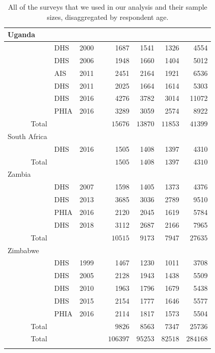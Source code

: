 \documentclass[a4paper, nobind]{templates/ociamthesis}
\newcommand{\cmark}{\ding{51}}
\newcommand{\xmark}{\ding{55}}
\begin{document}
\begin{longtable}{rlrcrrrr}
\midrule
\multicolumn{1}{l}{Uganda} \\ 
\midrule
 & DHS & 2000 & \xmark & 1687 & 1541 & 1326 & 4554 \\ 
 & DHS & 2006 & \xmark & 1948 & 1660 & 1404 & 5012 \\ 
 & AIS & 2011 & \xmark & 2451 & 2164 & 1921 & 6536 \\ 
 & DHS & 2011 & \xmark & 2025 & 1664 & 1614 & 5303 \\ 
 & DHS & 2016 & \cmark & 4276 & 3782 & 3014 & 11072 \\ 
 & PHIA & 2016 & \xmark & 3289 & 3059 & 2574 & 8922 \\ 
\midrule 
Total &  &  &  & $15676$ & $13870$ & $11853$ & $41399$ \\ 
\midrule
\multicolumn{1}{l}{South Africa} \\ 
\midrule
 & DHS & 2016 & \cmark & 1505 & 1408 & 1397 & 4310 \\ 
Total &  &  &  & $1505$ & $1408$ & $1397$ & $4310$ \\ 
\midrule
\multicolumn{1}{l}{Zambia} \\ 
\midrule
 & DHS & 2007 & \xmark & 1598 & 1405 & 1373 & 4376 \\ 
 & DHS & 2013 & \xmark & 3685 & 3036 & 2789 & 9510 \\ 
 & PHIA & 2016 & \cmark & 2120 & 2045 & 1619 & 5784 \\ 
 & DHS & 2018 & \cmark & 3112 & 2687 & 2166 & 7965 \\ 
Total &  &  &  & $10515$ & $9173$ & $7947$ & $27635$ \\ 
\midrule
\multicolumn{1}{l}{Zimbabwe} \\ 
\midrule
 & DHS & 1999 & \xmark & 1467 & 1230 & 1011 & 3708 \\ 
 & DHS & 2005 & \xmark & 2128 & 1943 & 1438 & 5509 \\ 
 & DHS & 2010 & \xmark & 1963 & 1796 & 1679 & 5438 \\ 
 & DHS & 2015 & \cmark & 2154 & 1777 & 1646 & 5577 \\ 
 & PHIA & 2016 & \cmark & 2114 & 1817 & 1573 & 5504 \\ 
Total &  &  &  & $9826$ & $8563$ & $7347$ & $25736$ \\ 
\midrule 
\midrule 
Total &  &  &  & $106397$ & $95253$ & $82518$ & $284168$ \\ 
\bottomrule
\caption{All of the surveys that we used in our analysis and their sample sizes, disaggregated by respondent age.}
\label{tab:surveys-used}
\end{longtable}
\end{document}
